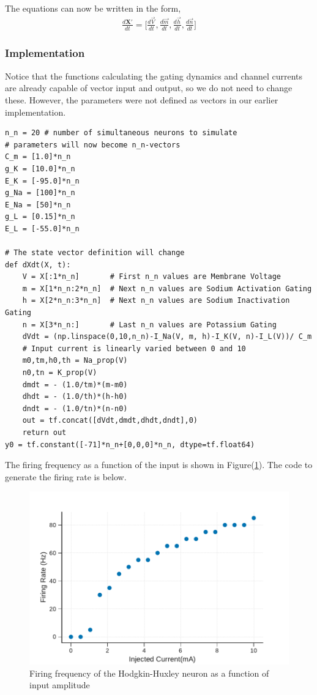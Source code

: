 \documentclass[10pt,letterpaper]{article}
\begin{document}
The equations can now be written in the form,
\begin{eqnarray}\frac{d\mathbf{X'}}{dt}= \Big[\frac{d\vec{V}}{dt},\frac{d\vec{m}}{dt},\frac{d\vec{h}}{dt},\frac{d\vec{n}}{dt}\Big]\end{eqnarray}

\subsubsection*{Implementation}

Notice that the functions calculating the gating dynamics and channel currents are already capable of vector input and output, so we do not need to change these. However, the parameters were not defined as vectors in our earlier implementation.

\begin{verbatim}
n_n = 20 # number of simultaneous neurons to simulate
# parameters will now become n_n-vectors
C_m = [1.0]*n_n
g_K = [10.0]*n_n
E_K = [-95.0]*n_n
g_Na = [100]*n_n
E_Na = [50]*n_n 
g_L = [0.15]*n_n
E_L = [-55.0]*n_n

# The state vector definition will change
def dXdt(X, t):
    V = X[:1*n_n]       # First n_n values are Membrane Voltage
    m = X[1*n_n:2*n_n]  # Next n_n values are Sodium Activation Gating
    h = X[2*n_n:3*n_n]  # Next n_n values are Sodium Inactivation Gating
    n = X[3*n_n:]       # Last n_n values are Potassium Gating
    dVdt = (np.linspace(0,10,n_n)-I_Na(V, m, h)-I_K(V, n)-I_L(V))/ C_m 
    # Input current is linearly varied between 0 and 10
    m0,tm,h0,th = Na_prop(V)
    n0,tn = K_prop(V)
    dmdt = - (1.0/tm)*(m-m0)
    dhdt = - (1.0/th)*(h-h0)
    dndt = - (1.0/tn)*(n-n0)
    out = tf.concat([dVdt,dmdt,dhdt,dndt],0)
    return out
y0 = tf.constant([-71]*n_n+[0,0,0]*n_n, dtype=tf.float64)
\end{verbatim}
The firing frequency as a function of the input is shown in Figure(\ref{fig:freq}). The code to generate the firing rate is below.
\begin{center}
\begin{figure}
\includegraphics[scale=0.6]{Figures/fig12.pdf} 
\caption{ Firing frequency of the Hodgkin-Huxley neuron as a function of input amplitude}
\label{fig:freq}
\end{figure}
\end{center}
\end{document}

